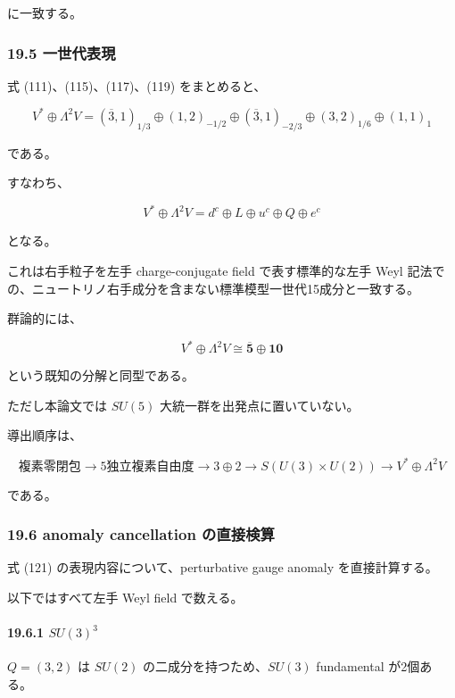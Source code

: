 \documentclass[
  a4paper,
]{ltjsarticle}
\begin{document}
に一致する。

\subsubsection{19.5 一世代表現}\label{ux4e00ux4e16ux4ee3ux8868ux73fe}

式 (111)、(115)、(117)、(119) をまとめると、

\[
\boxed{
V^*\oplus\Lambda^2V
=
(\overline3,1)_{1/3}
\oplus
(1,2)_{-1/2}
\oplus
(\overline3,1)_{-2/3}
\oplus
(3,2)_{1/6}
\oplus
(1,1)_1
}
\tag{121}
\]

である。

すなわち、

\[
\boxed{
V^*\oplus\Lambda^2V
=
d^c\oplus L\oplus u^c\oplus Q\oplus e^c
}
\tag{122}
\]

となる。

これは右手粒子を左手 charge-conjugate field で表す標準的な左手 Weyl
記法での、ニュートリノ右手成分を含まない標準模型一世代15成分と一致する。

群論的には、

\[
\boxed{
V^*\oplus\Lambda^2V
\cong
\overline{\mathbf5}
\oplus
\mathbf{10}
}
\tag{123}
\]

という既知の分解と同型である。

ただし本論文では \(SU(5)\) 大統一群を出発点に置いていない。

導出順序は、

\[
\boxed{
\text{複素零閉包}
\to
5\text{独立複素自由度}
\to
3\oplus2
\to
S(U(3)\times U(2))
\to
V^*\oplus\Lambda^2V
}
\tag{124}
\]

である。

\subsubsection{19.6 anomaly cancellation
の直接検算}\label{anomaly-cancellation-ux306eux76f4ux63a5ux691cux7b97}

式 (121) の表現内容について、perturbative gauge anomaly を直接計算する。

以下ではすべて左手 Weyl field で数える。

\paragraph{\texorpdfstring{19.6.1
\(SU(3)^3\)}{19.6.1 SU(3)\^{}3}}\label{su33}

\(Q=(3,2)\) は \(SU(2)\) の二成分を持つため、\(SU(3)\) fundamental
が2個ある。
\end{document}
